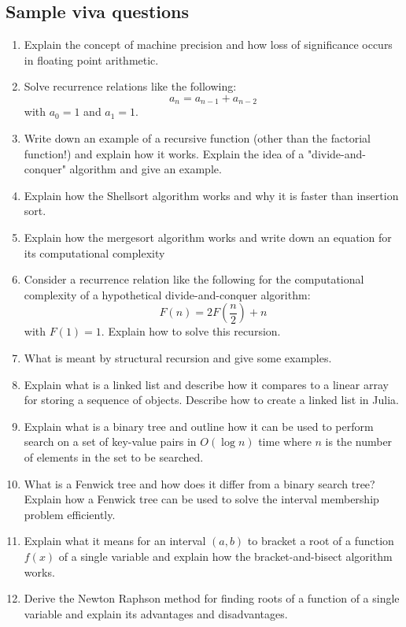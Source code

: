 \documentclass[11pt]{article}
\begin{document}
\begin{multicols}{2}
\section*{Sample viva questions}
\begin{enumerate}
\item Explain the concept of machine precision and how loss of significance occurs in floating point arithmetic.
\item
Solve recurrence relations like the following:
\begin{displaymath}
a_n = a_{n-1} + a_{n-2}
\end{displaymath}
with $a_0=1$ and $a_1=1$.
\item
Write down an example of a recursive function (other than the factorial function!) and explain how it works. Explain the idea of a "divide-and-conquer" algorithm and give an example.
\item
Explain how the Shellsort algorithm works and why it is faster than insertion sort.
\item
Explain how the mergesort algorithm works and write down an equation for its computational complexity
\item
Consider a recurrence relation like the following for the computational complexity of a hypothetical divide-and-conquer algorithm:
\begin{displaymath}
F(n) = 2 F\left(\frac{n}{2}\right) +n
\end{displaymath}
with $F(1)=1$. Explain how to solve this recursion.
\item
What is meant by structural recursion and give some examples.
\item
Explain what is a linked list and describe how it compares to a linear array for storing a sequence of objects. Describe how to create a linked list in Julia.
\item
Explain what is a binary tree and outline how it can be used to perform search on a set of key-value pairs in $O(\log n)$ time where $n$ is the number of elements in the set to be searched.
\item
What is a Fenwick tree and how does it differ from a binary search tree? Explain how a Fenwick tree can be used to solve the interval membership problem efficiently. 
\item
Explain what it means for an interval $(a,b)$ to bracket a root of a function $f(x)$ of a single variable and explain how the bracket-and-bisect algorithm works.
\item
Derive the Newton Raphson method for finding roots of a function of a single variable and explain its advantages and disadvantages.

\end{enumerate}
\end{multicols}
\end{document}
